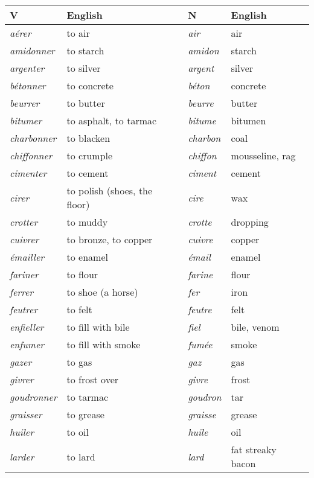 \documentclass[output=paper]{langsci/langscibook}
\begin{document}
\begin{table}
\begin{tabularx}{\textwidth}{lXll}
\lsptoprule
{V} & {English} & {N} &
{English}\\
\midrule
\emph{aérer} & to air & \emph{air} & air\\
\emph{amidonner} & to starch & \emph{amidon} & starch\\
\emph{argenter} & to silver & \emph{argent} & silver\\
\emph{bétonner} & to concrete & \emph{béton} & concrete\\
\emph{beurrer} & to butter & \emph{beurre} & butter\\
\emph{bitumer} & to asphalt, to tarmac & \emph{bitume} &
bitumen\\
\emph{charbonner} & to blacken & \emph{charbon} & coal\\
\emph{chiffonner} & to crumple & \emph{chiffon} & mousseline,
rag\\
\emph{cimenter} & to cement & \emph{ciment} & cement\\
\emph{cirer} & to polish (shoes, the floor) & \emph{cire} &
wax\\
\emph{crotter} & to muddy & \emph{crotte} & dropping\\
\emph{cuivrer} & to bronze, to copper & \emph{cuivre} &
copper\\
\emph{émailler} & to enamel & \emph{émail} & enamel\\
\emph{fariner} & to flour & \emph{farine} & flour\\
\emph{ferrer} & to shoe (a horse) & \emph{fer} & iron\\
\emph{feutrer} & to felt & \emph{feutre} & felt\\
\emph{enfieller} & to fill with bile & \emph{fiel} & bile,
venom\\
\emph{enfumer} & to fill with smoke & \emph{fumée} &
smoke\\
\emph{gazer} & to gas & \emph{gaz} & gas\\
\emph{givrer} & to frost over & \emph{givre} & frost\\
\emph{goudronner} & to tarmac & \emph{goudron} & tar\\
\emph{graisser} & to grease & \emph{graisse} & grease\\
\emph{huiler} & to oil & \emph{huile} & oil\\
\emph{larder} & to lard & \emph{lard} & fat streaky bacon\\

\end{tabularx}
\end{table}
\end{document}
